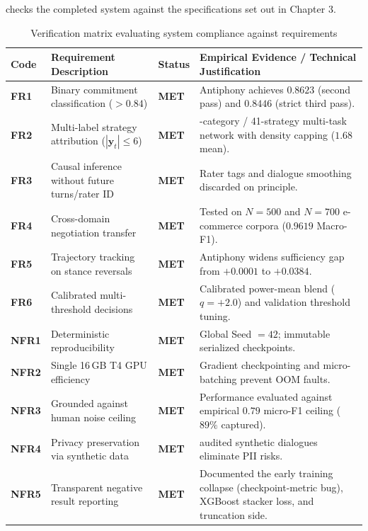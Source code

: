  checks the completed system against the specifications set out in Chapter 3.

\begin{table}[htbp]
  \centering
  \small
  \caption{Verification matrix evaluating system compliance against requirements}
  \label{tab:requirements-compliance}
  \begin{tabularx}{\textwidth}{>{\raggedright\arraybackslash\bfseries}p{} >{\raggedright\arraybackslash}p{} >{\centering\arraybackslash}p{} >{\raggedright\arraybackslash}X}
    \toprule
    \textbf{Code} & \textbf{Requirement Description} & \textbf{Status} & \textbf{Empirical Evidence / Technical Justification} \\
    \midrule
    FR1 & Binary commitment classification ($>0.84$) & \textbf{MET} & Antiphony achieves $0.8623$ (second pass) and $0.8446$ (strict third pass). \\
    \rowcolor{lightbg}
    FR2 & Multi-label strategy attribution ($|\mathbf{y}_t| \le 6$) & \textbf{MET} & 11-category / 41-strategy multi-task network with density capping ($1.68$ mean). \\
    FR3 & Causal inference without future turns/rater ID & \textbf{MET} & Rater tags and dialogue smoothing discarded on principle. \\
    \rowcolor{lightbg}
    FR4 & Cross-domain negotiation transfer & \textbf{MET} & Tested on $N=500$ and $N=700$ e-commerce corpora ($0.9619$ Macro-F1). \\
    FR5 & Trajectory tracking on stance reversals & \textbf{MET} & Antiphony widens sufficiency gap from $+0.0001$ to $+0.0384$. \\
    \rowcolor{lightbg}
    FR6 & Calibrated multi-threshold decisions & \textbf{MET} & Calibrated power-mean blend ($q=+2.0$) and validation threshold tuning. \\
    \midrule
    NFR1 & Deterministic reproducibility & \textbf{MET} & Global Seed $= 42$; immutable serialized checkpoints. \\
    \rowcolor{lightbg}
    NFR2 & Single 16\,GB T4 GPU efficiency & \textbf{MET} & Gradient checkpointing and micro-batching prevent OOM faults. \\
    NFR3 & Grounded against human noise ceiling & \textbf{MET} & Performance evaluated against empirical $0.79$ micro-F1 ceiling ($89\%$ captured). \\
    \rowcolor{lightbg}
    NFR4 & Privacy preservation via synthetic data & \textbf{MET} & 700 audited synthetic dialogues eliminate PII risks. \\
    NFR5 & Transparent negative result reporting & \textbf{MET} & Documented the early training collapse (checkpoint-metric bug), XGBoost stacker loss, and truncation side. \\
    \bottomrule
  \end{tabularx}
\end{table}

